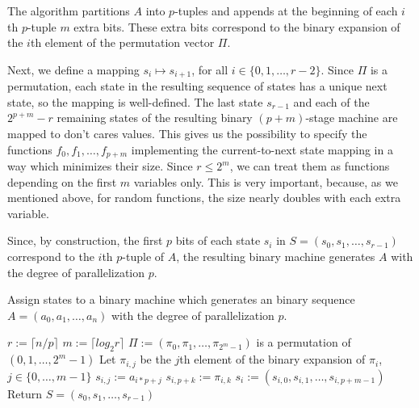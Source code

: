 \documentclass[10pt,conference]{IEEEtran}
\begin{document}
The algorithm partitions $A$ into $p$-tuples and appends at the beginning of each $i$th
$p$-tuple $m$ extra bits. These extra bits correspond to the binary expansion 
of the $i$th element of the permutation vector $\Pi$. 

Next, we define a mapping $s_i \mapsto s_{i+1}$, for all $i \in
\{0,1,\ldots,r-2\}$. Since $\Pi$ is a permutation, each state 
in the resulting sequence of states has a unique next state,
so the mapping is well-defined. 
The last state $s_{r-1}$ and each of the $2^{p+m}-r$ 
remaining states of the resulting binary $(p+m)$-stage machine 
are mapped to don't cares values. This 
gives us the possibility to specify the functions $f_0, f_1, \ldots, f_{p+m}$
implementing the current-to-next state mapping in a way which 
minimizes their size.
Since $r \leq 2^m$, we can treat them as functions depending
on the first $m$ variables only.
This is very important, because, as we mentioned above, 
for random functions, the size 
nearly doubles with each extra variable.

Since, by construction, the first $p$ bits of each state $s_i$
in $S = (s_0, s_1, \ldots, s_{r-1})$ correspond to the $i$th
$p$-tuple of $A$, the resulting binary machine generates $A$ 
with the degree of parallelization $p$.


\begin{algorithm}[t!]
\caption{Assign states to a binary machine
which generates an binary sequence $A = (a_0, a_1, \ldots, a_n)$ 
with the degree of parallelization $p$.}
\label{alg1}
\begin{algorithmic}[1]
{\small
\STATE $r := \lceil n/p \rceil$
\STATE $m := \lceil log_2 r \rceil$
\STATE $\Pi := (\pi_0, \pi_1, \ldots, \pi_{2^m-1})$ is a permutation of $(0,1,\ldots,2^m-1)$
\STATE Let $\pi_{i,j}$ be the $j$th element of the binary expansion of $\pi_i$, $j \in \{0,\ldots,m-1\}$
\STATE $s_{i,j} := a_{i*p+j}$  
\ENDFOR
{}
\STATE $s_{i,p+k} := \pi_{i,k}$  
\ENDFOR
\STATE $s_i := (s_{i,0}, s_{i,1}, \ldots, s_{i,p+m-1})$
\ENDFOR
\STATE Return $S = (s_0, s_1, \ldots, s_{r-1})$
}
\end{algorithmic}
\end{algorithm}
\end{document}
